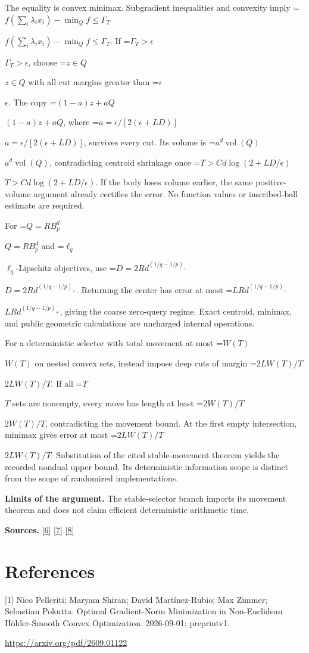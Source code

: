 \documentclass[10pt,a4paper]{article}
\newcommand{\AtlasMath}[1]{\par\begingroup\centering\setbox0=\hbox{$\displaystyle #1$}\ifdim\wd0>1.4\linewidth\typeout{ATLAS WIDE FORMULA: \the\wd0}\fi\ifdim\wd0>\linewidth\resizebox{\linewidth}{!}{\box0}\else\box0\fi\par\endgroup}
\newcommand{\AtlasInlineMath}[1]{\begingroup\setbox0=\hbox{$#1$}\ifdim\wd0>.4\linewidth\endgroup\AtlasMath{#1}\else\endgroup$#1$\fi}
\begin{document}
The equality is convex minimax. Subgradient inequalities and convexity imply
\AtlasInlineMath{f(\sum_i\lambda_ix_i)-\min_Qf\le\Gamma_T}.
If \AtlasInlineMath{\Gamma_T>\epsilon}, choose \AtlasInlineMath{z\in Q} with all cut margins greater than \AtlasInlineMath{\epsilon}. The copy \AtlasInlineMath{(1-a)z+aQ}, where \AtlasInlineMath{a=\epsilon/[2(\epsilon+LD)]}, survives every cut. Its volume is \AtlasInlineMath{a^d\operatorname{vol}(Q)}, contradicting centroid shrinkage once \AtlasInlineMath{T>C d\log(2+LD/\epsilon)}. If the body loses volume earlier, the same positive-volume argument already certifies the error. No function values or inscribed-ball estimate are required.

For \AtlasInlineMath{Q=RB_p^d} and \AtlasInlineMath{\ell_q}-Lipschitz objectives, use \AtlasInlineMath{D=2Rd^{(1/q-1/p)_+}}. Returning the center has error at most \AtlasInlineMath{LRd^{(1/q-1/p)_+}}, giving the coarse zero-query regime. Exact centroid, minimax, and public geometric calculations are uncharged internal operations.

For a deterministic selector with total movement at most \AtlasInlineMath{W(T)} on nested convex sets, instead impose deep cuts of margin \AtlasInlineMath{2LW(T)/T}. If all \AtlasInlineMath{T} sets are nonempty, every move has length at least \AtlasInlineMath{2W(T)/T}, contradicting the movement bound. At the first empty intersection, minimax gives error at most \AtlasInlineMath{2LW(T)/T}. Substitution of the cited stable-movement theorem yields the recorded nondual upper bound. Its deterministic information scope is distinct from the scope of randomized implementations.

\textbf{Limits of the argument.} The stable-selector branch imports its movement theorem and does not claim efficient deterministic arithmetic time.

\textbf{Sources.} \href{https://arxiv.org/pdf/1405.4980}{[6]} \href{https://www2.isye.gatech.edu/~nemirovs/MOR_AccuracyCertificates.pdf}{[7]} \href{https://arxiv.org/pdf/2609.20701}{[8]}

\section{References}
[1] Nico Pelleriti; Maryam Shiran; David Martínez-Rubio; Max Zimmer; Sebastian Pokutta. Optimal Gradient-Norm Minimization in Non-Euclidean Hölder-Smooth Convex Optimization. 2026-09-01; preprintv1.

\url{https://arxiv.org/pdf/2609.01122}
\end{document}
